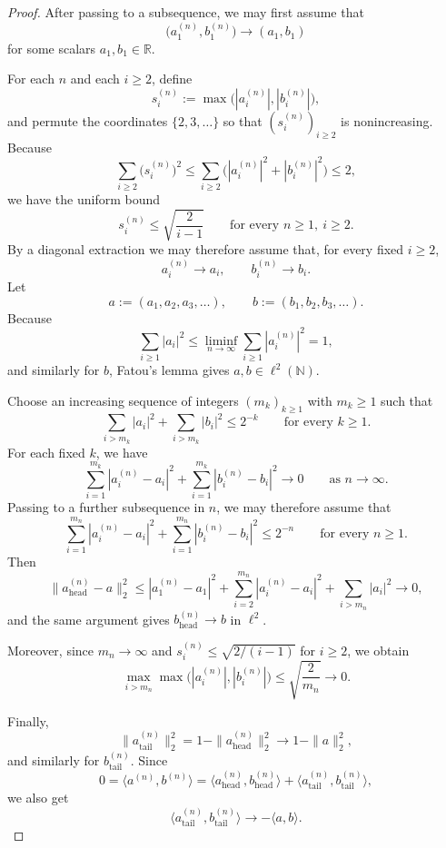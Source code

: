 \documentclass[11pt]{amsart}
\newcommand{\N}{\mathbb N}
\newcommand{\R}{\mathbb R}
\begin{document}
\begin{proof}
After passing to a subsequence, we may first assume that
\[
\bigl(a_1^{(n)},b_1^{(n)}\bigr) \longrightarrow (a_1,b_1)
\]
for some scalars $a_1,b_1 \in \R$.

For each $n$ and each $i \ge 2$, define
\[
s_i^{(n)} := \max\bigl( |a_i^{(n)}|, |b_i^{(n)}| \bigr),
\]
and permute the coordinates $\{2,3,\dots\}$ so that $(s_i^{(n)})_{i \ge 2}$ is
nonincreasing. Because
\[
\sum_{i \ge 2} \bigl(s_i^{(n)}\bigr)^2
\le
\sum_{i \ge 2} \bigl( |a_i^{(n)}|^2 + |b_i^{(n)}|^2 \bigr)
\le 2,
\]
we have the uniform bound
\[
s_i^{(n)} \le \sqrt{\frac{2}{i-1}}
\qquad
\text{for every } n \ge 1,\ i \ge 2.
\]
By a diagonal extraction we may therefore assume that, for every fixed
$i \ge 2$,
\[
a_i^{(n)} \longrightarrow a_i,
\qquad
b_i^{(n)} \longrightarrow b_i.
\]
Let
\[
a := (a_1,a_2,a_3,\dots),
\qquad
b := (b_1,b_2,b_3,\dots).
\]
Because
\[
\sum_{i \ge 1} |a_i|^2
\le
\liminf_{n \to \infty} \sum_{i \ge 1} |a_i^{(n)}|^2
= 1,
\]
and similarly for $b$, Fatou's lemma gives $a,b \in \ell^2(\N)$.

Choose an increasing sequence of integers $(m_k)_{k \ge 1}$ with $m_k \ge 1$
such that
\[
\sum_{i > m_k} |a_i|^2 + \sum_{i > m_k} |b_i|^2 \le 2^{-k}
\qquad
\text{for every } k \ge 1.
\]
For each fixed $k$, we have
\[
\sum_{i=1}^{m_k} |a_i^{(n)}-a_i|^2
+ \sum_{i=1}^{m_k} |b_i^{(n)}-b_i|^2
\longrightarrow 0
\qquad
\text{as } n \to \infty.
\]
Passing to a further subsequence in $n$, we may therefore assume that
\[
\sum_{i=1}^{m_n} |a_i^{(n)}-a_i|^2
+ \sum_{i=1}^{m_n} |b_i^{(n)}-b_i|^2
\le 2^{-n}
\qquad
\text{for every } n \ge 1.
\]
Then
\[
\|a^{(n)}_{\mathrm{head}}-a\|_2^2
\le
|a_1^{(n)}-a_1|^2
+ \sum_{i=2}^{m_n} |a_i^{(n)}-a_i|^2 + \sum_{i > m_n} |a_i|^2
\longrightarrow 0,
\]
and the same argument gives
$b^{(n)}_{\mathrm{head}} \to b$ in $\ell^2$.

Moreover, since $m_n \to \infty$ and
$s_i^{(n)} \le \sqrt{2/(i-1)}$ for $i \ge 2$, we obtain
\[
\max_{i > m_n} \max\bigl( |a_i^{(n)}|, |b_i^{(n)}| \bigr)
\le
\sqrt{\frac{2}{m_n}}
\longrightarrow 0.
\]

Finally,
\[
\|a^{(n)}_{\mathrm{tail}}\|_2^2
=
1-\|a^{(n)}_{\mathrm{head}}\|_2^2
\longrightarrow
1-\|a\|_2^2,
\]
and similarly for $b^{(n)}_{\mathrm{tail}}$. Since
\[
0 = \langle a^{(n)}, b^{(n)} \rangle
=
\langle a^{(n)}_{\mathrm{head}}, b^{(n)}_{\mathrm{head}} \rangle
+
\langle a^{(n)}_{\mathrm{tail}}, b^{(n)}_{\mathrm{tail}} \rangle,
\]
we also get
\[
\langle a^{(n)}_{\mathrm{tail}}, b^{(n)}_{\mathrm{tail}} \rangle
\longrightarrow
- \langle a,b \rangle.
\]
\end{proof}
\end{document}
